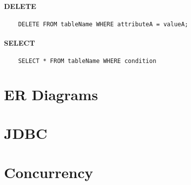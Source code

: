 \paragraph{DELETE}
\begin{verbatim}
	DELETE FROM tableName WHERE attributeA = valueA;
\end{verbatim}

\paragraph{SELECT}
\begin{verbatim}
	SELECT * FROM tableName WHERE condition
\end{verbatim}
\section{ER Diagrams}
\section{JDBC}
\section{Concurrency}